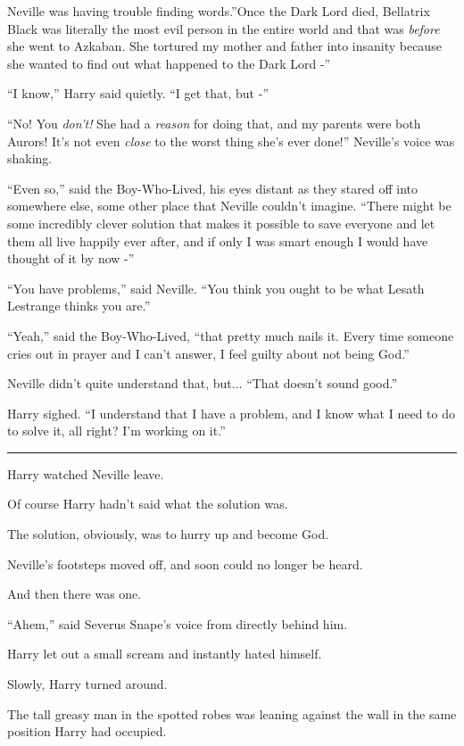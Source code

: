 Neville was having trouble finding words.''Once the Dark Lord died,
Bellatrix Black was literally the most evil person in the entire world
and that was \emph{before} she went to Azkaban. She tortured my mother
and father into insanity because she wanted to find out what happened to
the Dark Lord -''

``I know,'' Harry said quietly. ``I get that, but -''

``No! You \emph{don't!} She had a \emph{reason} for doing that, and my
parents were both Aurors! It's not even \emph{close} to the worst thing
she's ever done!'' Neville's voice was shaking.

``Even so,'' said the Boy-Who-Lived, his eyes distant as they stared off
into somewhere else, some other place that Neville couldn't imagine.
``There might be some incredibly clever solution that makes it possible
to save everyone and let them all live happily ever after, and if only I
was smart enough I would have thought of it by now -''

``You have problems,'' said Neville. ``You think you ought to be what
Lesath Lestrange thinks you are.''

``Yeah,'' said the Boy-Who-Lived, ``that pretty much nails it. Every
time someone cries out in prayer and I can't answer, I feel guilty about
not being God.''

Neville didn't quite understand that, but... ``That doesn't sound
good.''

Harry sighed. ``I understand that I have a problem, and I know what I
need to do to solve it, all right? I'm working on it.''

\begin{center}\rule{3in}{0.4pt}\end{center}

Harry watched Neville leave.

Of course Harry hadn't said what the solution was.

The solution, obviously, was to hurry up and become God.

Neville's footsteps moved off, and soon could no longer be heard.

And then there was one.

``Ahem,'' said Severus Snape's voice from directly behind him.

Harry let out a small scream and instantly hated himself.

Slowly, Harry turned around.

The tall greasy man in the spotted robes was leaning against the wall in
the same position Harry had occupied.

